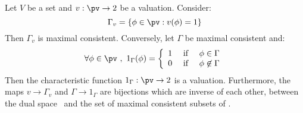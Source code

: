 \begin{prop}\label{logic:prop:FOPL:semantics:bijection:max:cons:val}
Let $V$ be a set and $v:\pv\to 2$ be a valuation. Consider:
    \[
    \Gamma_{v}=\{\phi\in\pv:v(\phi)=1\}
    \]
Then $\Gamma_{v}$ is maximal consistent. Conversely, let $\Gamma$ be
maximal consistent and:
     \[
     \forall \phi\in\pv\ ,\ 1_{\Gamma}(\phi)=\left\{
        \begin{array}{lcl}
        1&\mbox{\ if\ }&\phi\in\Gamma\\
        0&\mbox{\ if\ }&\phi\not\in\Gamma
        \end{array}
    \right.
    \]
Then the characteristic function $1_{\Gamma}:\pv\to 2$ is a
valuation. Furthermore, the maps $v\to\Gamma_{v}$ and $\Gamma\to
1_{\Gamma}$ are bijections which are inverse of each other, between
the dual space \pvd\ and the set of maximal consistent subsets of
\pv.
\end{prop}
